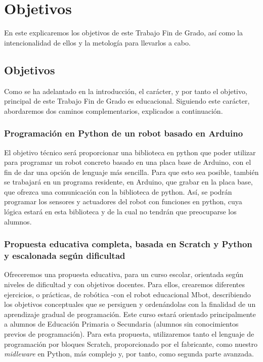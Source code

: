 \chapter{Objetivos}
\label{cap:objetivos}
En este explicaremos los objetivos de este Trabajo Fin de Grado, así como la intencionalidad de ellos y la metología para llevarlos a cabo.
\section{Objetivos}\label{sec:objetivos}
Como se ha adelantado en la introducción, el carácter, y por tanto el objetivo, principal de este Trabajo Fin de Grado es educacional. Siguiendo este carácter, abordaremos dos caminos complementarios, explicados a continuación. 

\subsection{Programación en Python de un robot basado en Arduino}\label{subsec:obj1} El objetivo técnico será proporcionar una biblioteca en python que poder utilizar para programar un robot concreto basado en una placa base de Arduino, con el fin de dar una opción de lenguaje más sencilla. Para que esto sea posible, también se trabajará en un programa residente, en Arduino, que grabar en la placa base, que ofrezca una comunicación con la biblioteca de python. Así, se podrán programar los sensores y actuadores del robot con funciones en python, cuya lógica estará en esta biblioteca y de la cual no tendrán que preocuparse los alumnos. 
	
\subsection{Propuesta educativa completa, basada en Scratch y Python y escalonada según dificultad} \label{subsec:obj2}
	Ofreceremos una propuesta educativa, para un curso escolar, orientada según niveles de dificultad y con objetivos docentes. Para ellos, crearemos diferentes ejercicios, o prácticas, de robótica -con el robot educacional Mbot, describiendo los objetivos conceptuales que se persiguen y ordenándolas con la finalidad de un aprendizaje gradual de programación. Este curso estará orientado principalmente a alumnos de Educación Primaria o Secundaria (alumnos sin conocimientos previos de programación). 
	Para esta propuesta, utilizaremos tanto el lenguaje de programación por bloques Scratch, proporcionado por el fabricante, como nuestro \textit{midleware} en Python, más complejo y, por tanto, como segunda parte avanzada.
	

